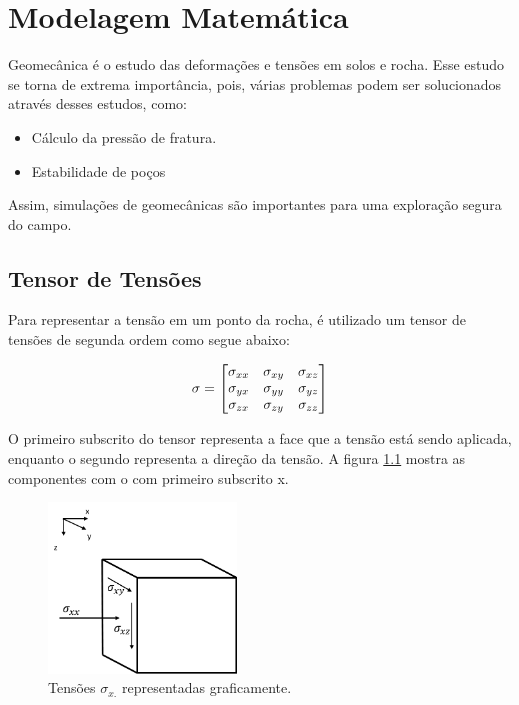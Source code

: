 

\chapter{Modelagem Matemática}

Geomecânica é o estudo das deformações e tensões em solos e rocha. Esse estudo se torna de extrema importância, pois, várias problemas podem ser solucionados através desses estudos, como:
\begin{itemize}
    \item Cálculo da pressão de fratura.
    \item Estabilidade de poços
\end{itemize}

Assim, simulações de geomecânicas são importantes para uma exploração segura do campo.

\section{Tensor de Tensões}

Para representar a tensão em um ponto da rocha, é utilizado um tensor de tensões de segunda ordem como segue abaixo:

\begin{equation}
\mathbf{\sigma} =
    \begin{bmatrix}
    \sigma_{xx} & \sigma_{xy} & \sigma_{xz} \\
    \sigma_{yx} & \sigma_{yy} & \sigma_{yz} \\
    \sigma_{zx} & \sigma_{zy} & \sigma_{zz} 
    \end{bmatrix}
\end{equation}

O primeiro subscrito do tensor representa a face que a tensão está sendo aplicada, enquanto o segundo representa a direção da tensão. A figura \ref{fig:tensoesx} mostra as componentes com o com primeiro subscrito x.


\begin{figure}[!htbp]
\label{fig:tensoesx}
\centering
\includegraphics[width=5cm]{chap01/tensor.png}
\caption{Tensões $\sigma_{x.}$ representadas graficamente.}
\end{figure}

